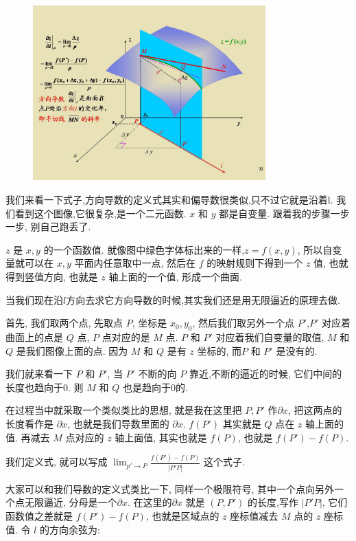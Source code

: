\begin{figure}[ht]
  \centering
  \includegraphics[width=0.8\textwidth]{asset/20230901103919.png}
  \caption{}
  \label{fig:img12_4}
\end{figure}

我们来看一下式子,方向导数的定义式其实和偏导数很类似,只不过它就是沿着l. 我们看到这个图像,它很复杂,是一个二元函数. $x$ 和 $y$ 都是自变量. 跟着我的步骤一步一步, 别自己跑丢了. 

$z$ 是 $x, y$ 的一个函数值. 就像图中绿色字体标出来的一样,$z = f(x, y)$, 所以自变量就可以在 $x, y$ 平面内任意取中一点, 然后在 $f$ 的映射规则下得到一个 $z$ 值, 也就得到竖值方向, 也就是 $z$ 轴上面的一个值, 形成一个曲面. 

当我们现在沿$l$方向去求它方向导数的时候,其实我们还是用无限逼近的原理去做. 

首先, 我们取两个点, 先取点 $P$, 坐标是 $x_0, y_0$, 然后我们取另外一个点 $P'$,$P'$ 对应着曲面上的点是 $Q$ 点, $P$ 点对应的是 $M$ 点. $P$ 和 $P'$ 对应着我们自变量的取值, $M$ 和$Q$ 是我们图像上面的点. 因为 $M$ 和 $Q$ 是有 $z$ 坐标的, 而$P$ 和 $P'$ 是没有的. 

我们就来看一下 $P$ 和 $P'$, 当 $P'$ 不断的向 $P$ 靠近,不断的逼近的时候, 它们中间的长度也趋向于0. 则 $M$ 和 $Q$ 也是趋向于0的. 

在过程当中就采取一个类似类比的思想, 就是我在这里把 $P, P'$ 作$\partial x$, 把这两点的长度看作是 $\partial x$, 也就是我们导数里面的 $\partial x$.  $f(P')$ 其实就是 $Q$ 点在 $z$ 轴上面的值. 再减去 $M$ 点对应的 $z$ 轴上面值, 其实也就是 $f(P)$, 也就是 $f(P') - f(P)$. 

我们定义式, 就可以写成 $\lim_{p' \to P} \frac{f(P') - f(P)}{|P'P|}$ 这个式子. 

大家可以和我们导数的定义式类比一下, 同样一个极限符号, 其中一个点向另外一个点无限逼近, 分母是一个$\partial x$. 在这里的$\partial x$ 就是 $(P,P')$ 的长度,写作 $|P'P|$, 它们函数值之差就是 $f(P') - f(P)$, 也就是区域点的 $z$ 座标值减去 $M$ 点的 $z$ 座标值. 令 $l$ 的方向余弦为: 

